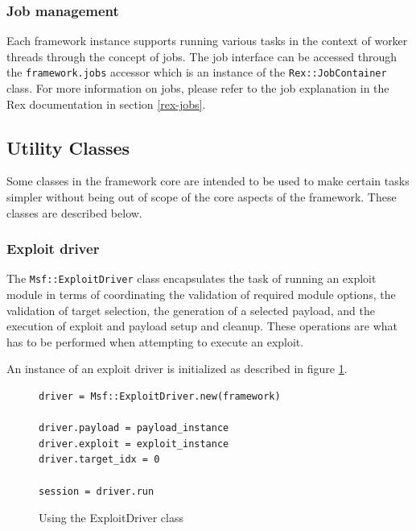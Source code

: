 \documentclass{report}
\begin{document}
            \subsubsection{Job management}

\par
Each framework instance supports running various tasks in the
context of worker threads through the concept of jobs.  The job
interface can be accessed through the \texttt{framework.jobs}
accessor which is an instance of the \texttt{Rex::JobContainer}
class.  For more information on jobs, please refer to the job
explanation in the Rex documentation in section \ref{rex-jobs}.

        \subsection{Utility Classes}

\par
Some classes in the framework core are intended to be used to make
certain tasks simpler without being out of scope of the core aspects
of the framework.  These classes are described below.

            \subsubsection{Exploit driver}

\par
The \texttt{Msf::ExploitDriver} class encapsulates the task of
running an exploit module in terms of coordinating the validation of
required module options, the validation of target selection, the
generation of a selected payload, and the execution of exploit and
payload setup and cleanup.  These operations are what has to be
performed when attempting to execute an exploit.

\par
An instance of an exploit driver is initialized as described in
figure \ref{fig-code-exploit-driver}.

\begin{figure}[h]
\begin{verbatim}
driver = Msf::ExploitDriver.new(framework)

driver.payload = payload_instance
driver.exploit = exploit_instance
driver.target_idx = 0

session = driver.run
\end{verbatim}
\caption{Using the ExploitDriver class}
\label{fig-code-exploit-driver}
\end{figure}
\end{document}
